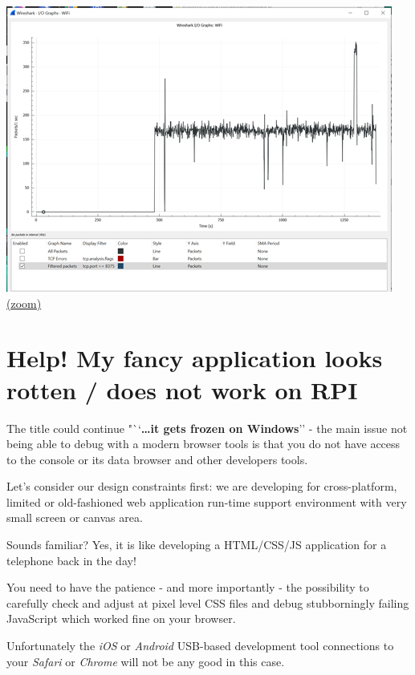 \documentclass[11pt]{article}
\begin{document}
    \includegraphics{2020-02-09_wireshark_wifi_rate_8375TCP_procexp_01_instrujs_clients_alpha_02_sk1-21-0_RPIclient_WinSKsrv.png}
\href{2020-02-09_wireshark_wifi_rate_8375TCP_procexp_01_instrujs_clients_alpha_02_sk1-21-0_RPIclient_WinSKsrv.png}{(zoom)}

    \hypertarget{help-my-fancy-application-looks-rotten-does-not-work-on-rpi}{%
\section{Help! My fancy application looks rotten / does not work on
RPI}\label{help-my-fancy-application-looks-rotten-does-not-work-on-rpi}}

    The title could continue "``\textbf{\ldots it gets frozen on Windows}''
- the main issue not being able to debug with a modern browser tools is
that you do not have access to the console or its data browser and other
developers tools.

    Let's consider our design constraints first: we are developing for
cross-platform, limited or old-fashioned web application run-time
support environment with very small screen or canvas area.

    Sounds familiar? Yes, it is like developing a HTML/CSS/JS application
for a telephone back in the day!

    You need to have the patience - and more importantly - the possibility
to carefully check and adjust at pixel level CSS files and debug
stubborningly failing JavaScript which worked fine on your browser.

    Unfortunately the \emph{iOS} or \emph{Android} USB-based development
tool connections to your \emph{Safari} or \emph{Chrome} will not be any
good in this case.
\end{document}
